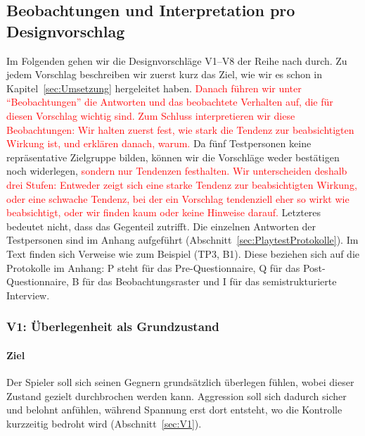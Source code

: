 \documentclass[../Main.tex]{subfiles}
\begin{document}
\subsection{Beobachtungen und Interpretation pro Designvorschlag} \label{sec:ErgVorschlag} \label{sec:Interpretation}

Im Folgenden gehen wir die Designvorschläge V1--V8 der Reihe nach durch. Zu jedem Vorschlag beschreiben wir zuerst kurz das Ziel, wie wir es schon in Kapitel~\ref{sec:Umsetzung} hergeleitet haben. \textcolor{red}{Danach führen wir unter \enquote{Beobachtungen} die Antworten und das beobachtete Verhalten auf, die für diesen Vorschlag wichtig sind. Zum Schluss interpretieren wir diese Beobachtungen:} \textcolor{red}{Wir halten zuerst fest, wie stark die Tendenz zur beabsichtigten Wirkung ist, und erklären danach, warum.} Da fünf Testpersonen keine repräsentative Zielgruppe bilden, können wir die Vorschläge weder bestätigen noch widerlegen, \textcolor{red}{sondern nur Tendenzen festhalten.} \textcolor{red}{Wir unterscheiden deshalb drei Stufen: Entweder zeigt sich eine starke Tendenz zur beabsichtigten Wirkung, oder eine schwache Tendenz, bei der ein Vorschlag tendenziell eher so wirkt wie beabsichtigt, oder wir finden kaum oder keine Hinweise darauf.} Letzteres bedeutet nicht, dass das Gegenteil zutrifft. Die einzelnen Antworten der Testpersonen sind im Anhang aufgeführt (Abschnitt~\ref{sec:PlaytestProtokolle}). Im Text finden sich Verweise wie zum Beispiel (TP3, B1). Diese beziehen sich auf die Protokolle im Anhang: P steht für das Pre-Questionnaire, Q für das Post-Questionnaire, B für das Beobachtungsraster und I für das semistrukturierte Interview.

\subsubsection{V1: Überlegenheit als Grundzustand}

\paragraph{Ziel}
Der Spieler soll sich seinen Gegnern grundsätzlich überlegen fühlen, wobei dieser Zustand gezielt durchbrochen werden kann. Aggression soll sich dadurch sicher und belohnt anfühlen, während Spannung erst dort entsteht, wo die Kontrolle kurzzeitig bedroht wird (Abschnitt~\ref{sec:V1}).
\end{document}
